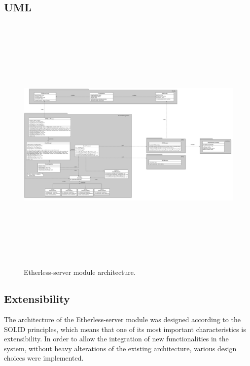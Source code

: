 	\begin{landscape}
	\subsection{UML}
		\begin{figure}[H]
			\includegraphics[width=24cm, height=13cm]{././diagrammi/etherless-server/Etherless-server-package-class.png}
			\caption{Etherless-server module architecture.}
		\end{figure}
	\end{landscape}
	\restoregeometry

	\subsection{Extensibility}  %
	The architecture of the Etherless-server module was designed according to the SOLID principles, which means that one of its most important characteristics is extensibility. In order to allow the integration of new functionalities in the system, without heavy alterations of the existing architecture, various design choices were implemented.

